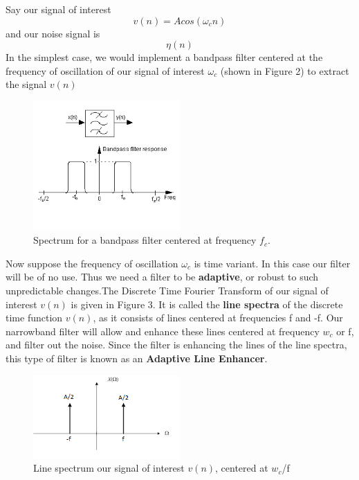 Say our signal of interest $$v(n)= Acos(\omega_cn)$$ and our noise signal is $$\eta(n)$$In the simplest case, we would implement a bandpass filter centered at the frequency of oscillation of our signal of interest $\omega_c$ (shown in Figure 2) to extract the signal $v(n)$

\begin{figure}[!ht]
\centering
\includegraphics[width=0.5\textwidth]{bandpass_filter.png}
\caption{\label{fig:bandpass_filter}Spectrum for a bandpass filter centered at frequency $f_c$.}
\end{figure}

Now suppose the frequency of oscillation $\omega_c$ is time variant. In this case our filter will be of no use. Thus we need a filter to be \textbf{adaptive}, or robust to such unpredictable changes.The Discrete Time Fourier Transform of our signal of interest $v(n)$ is given in Figure 3. It is called the \textbf{line spectra} of the discrete time function $v(n)$, as it consists of lines centered at frequencies f and -f. Our narrowband filter will allow and enhance these lines centered at frequency $w_c$ or f, and filter out the noise. Since the filter is enhancing the lines of the line spectra, this type of filter is known as an \textbf{Adaptive Line Enhancer}.

\begin{figure}[!ht]
\centering
\includegraphics[width=0.5\textwidth]{cosinedtft.png}
\caption{\label{fig:cosinedtft}Line spectrum our signal of interest $v(n)$, centered at $w_c$/f}
\end{figure}


